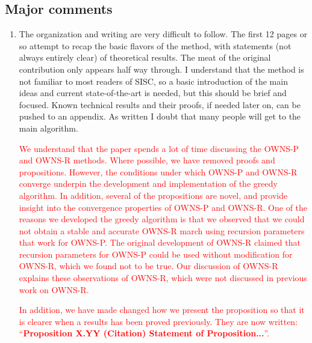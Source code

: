 \documentclass{article}
\newcommand{\response}[1]{\textcolor{red}{#1}}
\begin{document}
\subsection*{Major comments}

\begin{enumerate}
    \item The organization and writing are very difficult to follow. The first 12 pages or so attempt to recap the basic flavors of the method, with statements (not always entirely clear) of theoretical results. The meat of the original contribution only appears half way through. I understand that the method is not familiar to most readers of SISC, so a basic introduction of the main ideas and current state-of-the-art is needed, but this should be brief and focused. Known technical results and their proofs, if needed later on, can be pushed to an appendix. As written I doubt that many people will get to the main algorithm.

    \response{We understand that the paper spends a lot of time discussing the OWNS-P and OWNS-R methods. Where possible, we have removed proofs and propositions. However, the conditions under which OWNS-P and OWNS-R converge underpin the development and implementation of the greedy algorithm. In addition, several of the propositions are novel, and provide insight into the convergence properties of OWNS-P and OWNS-R. One of the reasons we developed the greedy algorithm is that we observed that we could not obtain a stable and accurate OWNS-R march using recursion parameters that work for OWNS-P. The original development of OWNS-R claimed that recursion parameters for OWNS-P could be used without modification for OWNS-R, which we found not to be true. Our discussion of OWNS-R explains these observations of OWNS-R, which were not discussed in previous work on OWNS-R.}
    
    \response{In addition, we have made changed how we present the proposition so that it is clearer when a results has been proved previously. They are now written: ``\textbf{Proposition X.YY (Citation) Statement of Proposition...}''.}


\end{enumerate}
\end{document}
